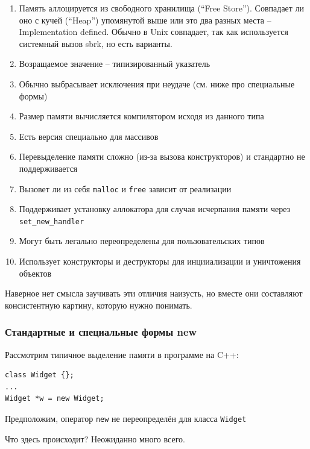 \documentclass[a4paper,12pt,oneside]{article}
\begin{document}
\begin{enumerate}
\item
Память аллоцируется из свободного хранилища (``Free Store''). Совпадает ли оно с кучей (``Heap'') упомянутой выше или это два разных места -- Implementation defined. Обычно в Unix совпадает, так как используется системный вызов sbrk, но есть варианты.
\item
Возращаемое значение -- типизированный указатель
\item
Обычно выбрасывает исключения при неудаче (см. ниже про специальные формы)
\item
Размер памяти вычисляется компилятором исходя из данного типа
\item
Есть версия специально для массивов
\item
Перевыделение памяти сложно (из-за вызова конструкторов) и стандартно не поддерживается
\item
Вызовет ли из себя \lstinline!malloc! и \lstinline!free! зависит от реализации
\item
Поддерживает установку аллокатора для случая исчерпания памяти через \lstinline!set_new_handler!
\item
Могут быть легально переопределены для пользовательских типов
\item
Использует конструкторы и деструкторы для инцииализации и уничтожения объектов
\end{enumerate}

Наверное нет смысла заучивать эти отличия наизусть, но вместе они составляют консистентную картину, которую нужно понимать.

\subsubsection{Стандартные и специальные формы new}\label{PlacementNew}

Рассмотрим типичное выделение памяти в программе на C++:

\begin{lstlisting}
class Widget {};
...
Widget *w = new Widget;
\end{lstlisting}

Предположим, оператор \lstinline!new! не переопределён для класса \lstinline!Widget!

Что здесь происходит? Неожиданно много всего.
\end{document}
